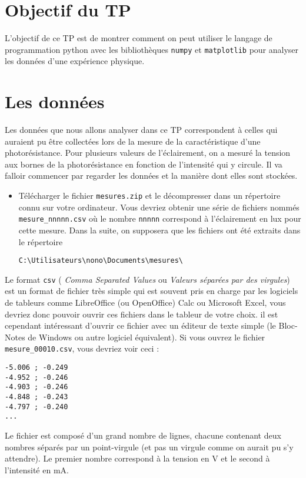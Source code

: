 \documentclass{tp}
\begin{document}

\section{Objectif du TP}
L'objectif de ce TP est de montrer comment on peut utiliser le langage de programmation python avec les bibliothèques \texttt{numpy} et \texttt{matplotlib} pour analyser les données d'une expérience physique.

\section{Les données}%
\label{sec:les_donnees}

Les données que nous allons analyser dans ce TP correspondent à celles qui auraient pu être collectées lors de la mesure de la caractéristique d'une photorésistance. Pour plusieurs valeurs de l'éclairement, on a mesuré la tension aux bornes de la photorésistance en fonction de l'intensité qui y circule. Il va falloir commencer par regarder les données et la manière dont elles sont stockées.

\begin{itemize}
  \item Télécharger le fichier \texttt{mesures.zip} et le décompresser dans un répertoire connu sur votre ordinateur. Vous devriez obtenir une série de fichiers nommés \texttt{mesure\_nnnnn.csv} où le nombre \texttt{nnnnn} correspond à l'éclairement en \si{lux} pour cette mesure. Dans la suite, on supposera que les fichiers ont été extraits dans le répertoire 

  \texttt{C:\textbackslash Utilisateurs\textbackslash nono\textbackslash Documents\textbackslash mesures\textbackslash} 
\end{itemize}

Le format \texttt{csv} ( \textit{Comma Separated Values} ou \textit{Valeurs séparées par des virgules}) est un format de fichier très simple qui est souvent pris en charge par les logiciels de tableurs comme LibreOffice (ou OpenOffice) Calc ou Microsoft Excel, vous devriez donc pouvoir ouvrir ces fichiers dans le tableur de votre choix. il est cependant intéressant d'ouvrir ce fichier avec un éditeur de texte simple (le Bloc-Notes de Windows ou autre logiciel équivalent). Si vous ouvrez le fichier \texttt{mesure\_00010.csv}, vous devriez voir ceci :
\begin{verbatim}
-5.006 ; -0.249
-4.952 ; -0.246
-4.903 ; -0.246
-4.848 ; -0.243
-4.797 ; -0.240
...
\end{verbatim}
Le fichier est composé d'un grand nombre de lignes, chacune contenant deux nombres séparés par un point-virgule (et pas un virgule comme on aurait pu s'y attendre). Le premier nombre correspond à la tension en \si{V} et le second à l'intensité en \si{mA}. 
\end{document}
